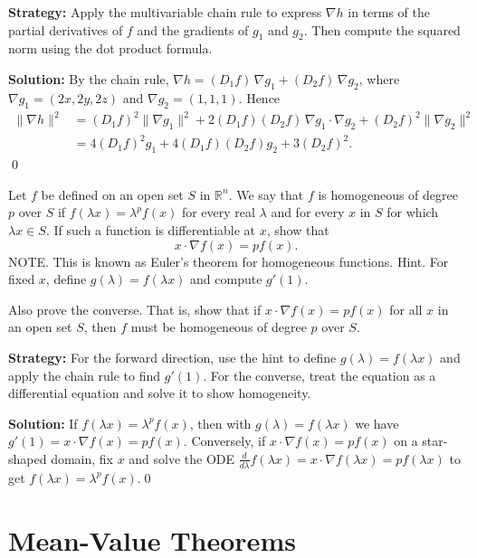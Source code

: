 \noindent\textbf{Strategy:} Apply the multivariable chain rule to express \( \nabla h \) in terms of the partial derivatives of \( f \) and the gradients of \( g_1 \) and \( g_2 \). Then compute the squared norm using the dot product formula.

\bigskip\noindent\textbf{Solution:}
By the chain rule, $\nabla h=(D_1 f)\,\nabla g_1+(D_2 f)\,\nabla g_2$, where $\nabla g_1=(2x,2y,2z)$ and $\nabla g_2=(1,1,1)$. Hence
\begin{align*}
\|\nabla h\|^2&=(D_1 f)^2\|\nabla g_1\|^2+2(D_1 f)(D_2 f)\,\nabla g_1\!\cdot\!\nabla g_2+(D_2 f)^2\|\nabla g_2\|^2\\
&=4(D_1 f)^2 g_1+4(D_1 f)(D_2 f) g_2+3(D_2 f)^2.
\end{align*}\qed


\begin{problembox}
\begin{problemstatement}
Let \( f \) be defined on an open set \( S \) in \( \mathbb{R}^n \). We say that \( f \) is homogeneous of degree \( p \) over \( S \) if \( f(\lambda x) = \lambda^p f(x) \) for every real \( \lambda \) and for every \( x \) in \( S \) for which \( \lambda x \in S \). If such a function is differentiable at \( x \), show that
\[x \cdot \nabla f(x) = p f(x).\]
NOTE. This is known as Euler's theorem for homogeneous functions. Hint. For fixed \( x \), define \( g(\lambda) = f(\lambda x) \) and compute \( g'(1) \).

Also prove the converse. That is, show that if \( x \cdot \nabla f(x) = p f(x) \) for all \( x \) in an open set \( S \), then \( f \) must be homogeneous of degree \( p \) over \( S \).
\end{problemstatement}
\end{problembox}

\noindent\textbf{Strategy:} For the forward direction, use the hint to define \( g(\lambda) = f(\lambda x) \) and apply the chain rule to find \( g'(1) \). For the converse, treat the equation as a differential equation and solve it to show homogeneity.

\bigskip\noindent\textbf{Solution:}
If $f(\lambda x)=\lambda^p f(x)$, then with $g(\lambda)=f(\lambda x)$ we have $g'(1)=x\cdot\nabla f(x)=p f(x)$. Conversely, if $x\cdot\nabla f(x)=p f(x)$ on a star-shaped domain, fix $x$ and solve the ODE $\tfrac{d}{d\lambda}f(\lambda x)=x\cdot\nabla f(\lambda x)=p f(\lambda x)$ to get $f(\lambda x)=\lambda^p f(x)$.\qed
\section{Mean-Value Theorems}

